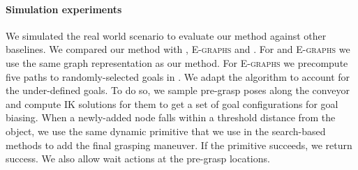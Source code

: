 \documentclass[a4paper,10pt]{article}
\begin{document}

\paragraph{Simulation experiments}






We simulated the real world scenario to evaluate our method against other baselines. We compared our method with \wastar, \textsc{E-graphs} and \rrt. 
For \wastar and \textsc{E-graphs} we use the same graph representation as our method. 
For \textsc{E-graphs} we precompute five paths to randomly-selected  goals in \Gfull. 
We adapt the \rrt algorithm to account for the under-defined goals. To do so, we sample pre-grasp poses along the conveyor 
and compute IK solutions for them to get a set of goal configurations for goal biasing. 
When a newly-added node falls within a threshold distance from the object, we use the same dynamic primitive that we use in the search-based methods to add the final grasping maneuver. If the primitive succeeds, we return success. We also allow wait actions at the pre-grasp locations.
\end{document}
